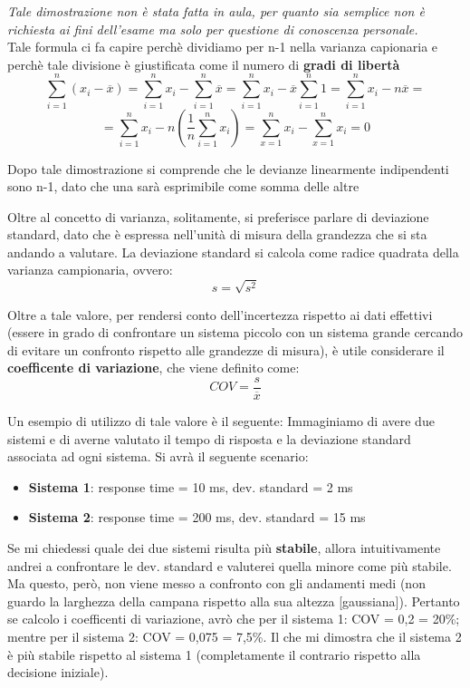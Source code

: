 \begin{warn}

\textit{Tale dimostrazione non è stata fatta in aula, per quanto sia semplice non è richiesta ai fini dell'esame ma solo per questione di conoscenza personale.}\\ 
Tale formula ci fa capire perchè dividiamo per n-1 nella varianza capionaria e perchè tale divisione è giustificata come il numero di \textbf{gradi di libertà}
\[
\sum_{i=1}^{n}(x_i - \overline{x}) = \sum_{i=1}^{n}x_i - \sum_{i=1}^{n}\overline{x} = \sum_{i=1}^{n}x_i - \overline{x} \sum_{i=1}^{n}1 = \sum_{i=1}^{n}x_i - n \overline{x} = 
\]
\[
=\sum_{i=1}^{n}x_i - n \left(\frac{1}{n}\sum_{i=1}^{n}x_i\right) =\sum_{x=1}^{n}x_i - \sum_{x=1}^{n}x_i = 0
\]

Dopo tale dimostrazione si comprende che le devianze linearmente indipendenti sono n-1, dato che una sarà esprimibile come somma delle altre
\end{warn}

Oltre al concetto di varianza, solitamente, si preferisce parlare di deviazione standard, dato che è espressa nell'unità di misura della grandezza che si sta andando a valutare. La deviazione standard si calcola come radice quadrata della varianza campionaria, ovvero:
\[
s = \sqrt{s^2}
\]

Oltre a tale valore, per rendersi conto dell'incertezza rispetto ai dati effettivi (essere in grado di confrontare un sistema piccolo con un sistema grande cercando di evitare un confronto rispetto alle grandezze di misura), è utile considerare il \textbf{coefficente di variazione}, che viene definito come:
\[
COV = \frac{s}{\overline{x}}
\]

Un esempio di utilizzo di tale valore è il seguente:
Immaginiamo di avere due sistemi e di averne valutato il tempo di risposta e la deviazione standard associata ad ogni sistema. Si avrà il seguente scenario:
\begin{itemize}
    \item \textbf{Sistema 1}: response time = 10 ms, dev. standard = 2 ms
    \item \textbf{Sistema 2}: response time = 200 ms, dev. standard = 15 ms
\end{itemize}

Se mi chiedessi quale dei due sistemi risulta più \textbf{stabile}, allora intuitivamente andrei a confrontare le dev. standard e valuterei quella minore come più stabile. Ma questo, però, non viene messo a confronto con gli andamenti medi (non guardo la larghezza della campana rispetto alla sua altezza [gaussiana]). Pertanto se calcolo i coefficenti di variazione, avrò che per il sistema 1: COV = 0,2 = 20\%; mentre per il sistema 2: COV = 0,075 = 7,5\%. Il che mi dimostra che il sistema 2 è più stabile rispetto al sistema 1 (completamente il contrario rispetto alla decisione iniziale).

